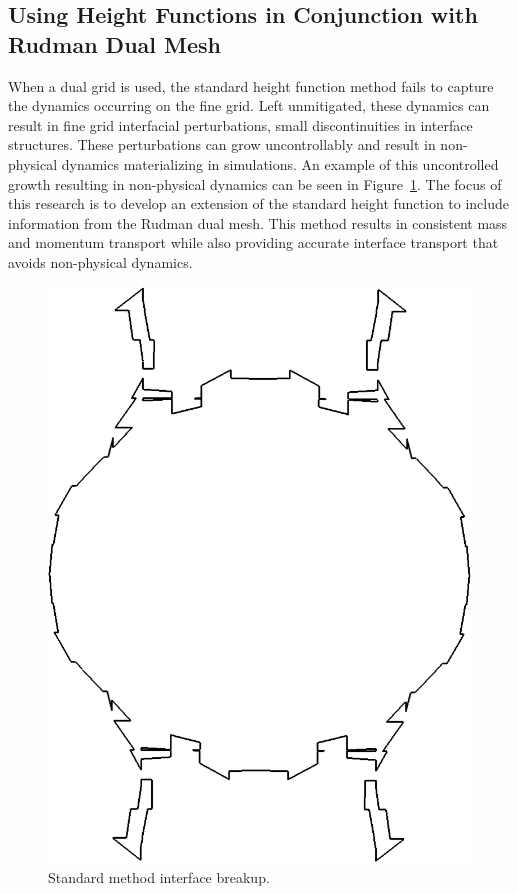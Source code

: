 \subsection{Using Height Functions in Conjunction with Rudman Dual Mesh }
When a dual grid is used, the standard height function method fails to capture the dynamics occurring on the fine grid. Left unmitigated, these dynamics can result in fine grid interfacial perturbations, small discontinuities in interface structures. These perturbations can grow uncontrollably and result in non-physical dynamics materializing in simulations. An example of this uncontrolled growth resulting in non-physical dynamics can be seen in Figure~\ref{bad2}. The focus of this research is to develop an extension of the standard height function to include information from the Rudman dual mesh. This method results in consistent mass and momentum transport while also providing accurate interface transport that avoids non-physical dynamics.
\begin{figure}[h!]
	\centering
		\includegraphics[scale=0.25]{figs/bad.png}
	\caption{Standard method interface breakup.}
	\label{bad2} 
\end{figure} 

